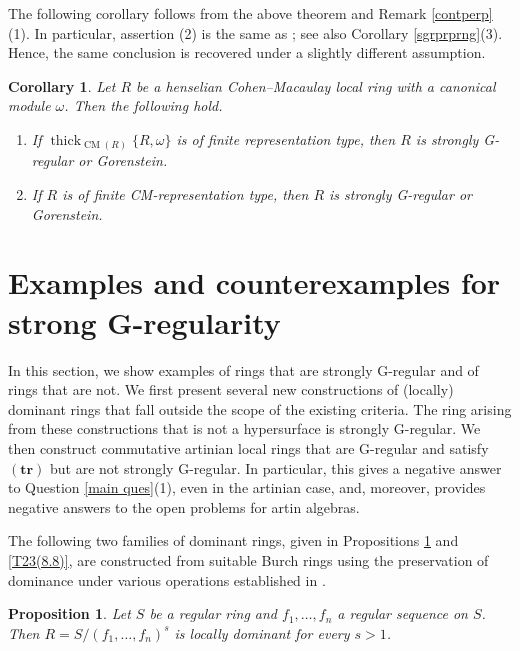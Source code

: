 \documentclass{amsart}
\newtheorem{prop}[thm]{Proposition}
\newtheorem{cor}[thm]{Corollary}
\theoremstyle{definition}
\theoremstyle{remark}
\numberwithin{equation}{thm}
\def\cm{\operatorname{CM}}
\def\thick{\operatorname{thick}}
\def\TR{(\mathbf{tr})}
\begin{document}
The following corollary follows from the above theorem and Remark \ref{contperp}(1).
In particular, assertion (2) is the same as \cite[Theorem 1.3{\rm(1)}]{DKLO25}; see also Corollary \ref{sgrprprng}{\rm(3)}.
Hence, the same conclusion is recovered under a slightly different assumption.

\begin{cor}\label{contfincor}
Let $R$ be a henselian Cohen--Macaulay local ring with a canonical module $\omega$. Then the following hold.
\begin{enumerate}[\rm(1)]
    \item
    If $\thick_{\cm(R)}\{R,\omega\}$ is of finite representation type, then $R$ is strongly G-regular or Gorenstein.
    \item 
    If $R$ is of finite CM-representation type, then $R$ is strongly G-regular or Gorenstein.
\end{enumerate}
\end{cor}


\section{Examples and counterexamples for strong G-regularity}

In this section, we show examples of rings that are strongly G-regular and of rings that are not. We first present several new constructions of (locally) dominant rings that fall outside the scope of the existing criteria. The ring arising from these constructions that is not a hypersurface is strongly G-regular. We then construct commutative artinian local rings that are G-regular and satisfy $\TR$ but are not strongly G-regular. In particular, this gives a negative answer to Question \ref{main ques}(1), even in the artinian case, and, moreover, provides negative answers to the open problems \cite[Problems A, B, and C]{Che17} for artin algebras.

The following two families of dominant rings, given in Propositions \ref{power} and \ref{T23(8.8)}, are constructed from suitable Burch rings using the preservation of dominance under various operations established in \cite{T23}.

\begin{prop}\label{power}
Let $S$ be a regular ring and $f_1,\ldots,f_n$ a regular sequence on $S$. Then $R=S/(f_1,\ldots,f_n)^s$ is locally dominant for every $s>1$.
\end{prop}
\end{document}
